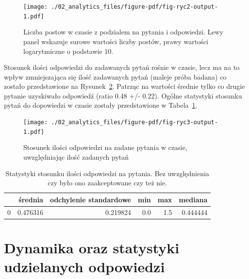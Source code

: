 \documentclass[
  letterpaper,
  DIV=11,
  numbers=noendperiod]{scrreprt}
\begin{document}
\begin{figure}

{\centering \texttt{[image: ./02\_analytics\_files/figure-pdf/fig-ryc2-output-1.pdf]}

}

\caption{\label{fig-ryc2}Liczba postow w czasie z podzialem na pytania i
odpowiedzi. Lewy panel wskazuje surowe wartości liczby postów, prawy
wartości logarytmiczne o podstawie 10.}

\end{figure}

Stosunek ilości odpowiedzi do zadawanych pytań rośnie w czasie, lecz ma
na to wpływ zmniejszająca się ilość zadawanych pytań (maleje próba
badana) co zostało przedstawione na Rysunek~\ref{fig-ryc3}. Patrząc na
wartości średnie tylko co drugie pytanie uzyskiwało odpowiedź (ratio
0.48 +/- 0.22). Ogólne statystyki stosunku pytań do dopowiedzi w czasie
zostały przedstawione w Tabela~\ref{tbl-ratios}.

\begin{figure}

{\centering \texttt{[image: ./02\_analytics\_files/figure-pdf/fig-ryc3-output-1.pdf]}

}

\caption{\label{fig-ryc3}Stosunek ilości odpowiedzi na zadane pytania w
czasie, uwzględniając ilość zadanych pytań}

\end{figure}

\hypertarget{tbl-ratios}{}
\begin{table}
\caption{\label{tbl-ratios}Statystyki stosunku ilości odpowiedzi na pytania. Bez uwzględnienia czy
było ono zaakceptowane czy też nie. }\tabularnewline

\centering
\begin{tabular}{lrrrrr}
\toprule
{} &   średnia &  odchylenie standardowe &  min &  max &   mediana \\
\midrule
0 &  0.476316 &                0.219824 &  0.0 &  1.5 &  0.444444 \\
\bottomrule
\end{tabular}
\end{table}

\hypertarget{dynamika-oraz-statystyki-udzielanych-odpowiedzi}{%
\section{Dynamika oraz statystyki udzielanych
odpowiedzi}\label{dynamika-oraz-statystyki-udzielanych-odpowiedzi}}
\end{document}
